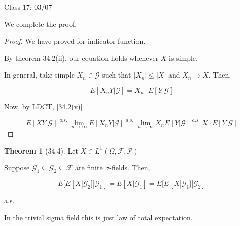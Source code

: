 \documentclass{article}
\theoremstyle{definition}
\newtheorem{theorem}{Theorem}
\begin{document}
\hrulefill

Class 17: 03/07

We complete the proof.

\begin{proof}
    We have proved for indicator function.

    By theorem 34.2(ii), our equation holds whenever \(X\) is simple.

    In general, take simple \(X_n\in \mathscr{G}\) such that \(\vert X_n \vert \leq \vert X \vert \) and \(X_n \to X\). Then,

    \[
        E[X_n Y | \mathscr{G}] = X_n \cdot E[Y|\mathscr{G}]
    \]

    Now, by LDCT, [34.2(v)]

    \[
        E[XY|\mathscr{G}] \overset{a.s.}{=} \lim_{n \to \infty} E[X_n Y | \mathscr{G}] \overset{a.s.}{=} \lim_{n \to \infty} X_n E[Y|\mathscr{G}] \overset{a.s.}{=} X\cdot E[Y|\mathscr{G}]
    \]

\end{proof}

\begin{theorem}
    [34.4]

    Let \(X\in L^1(\Omega , \mathscr{F} , \mathscr{P})\) 

    Suppose \(\mathscr{G} _1 \subseteq \mathscr{G} _2 \subseteq \mathscr{F}\) are finite \(\sigma\)-fields. Then,

    \[
        E[E[X|\mathscr{G}_2]|\mathscr{G}_1] = E[X|\mathscr{G}_1] = E[E[X|\mathscr{G}_1]|\mathscr{G}_2]
    \]

    a.s.

    In the trivial sigma field this is just law of total expectation.

\end{theorem}
\end{document}
